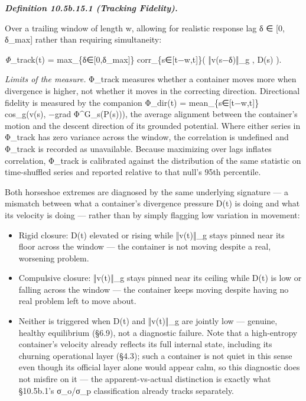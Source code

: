 \documentclass[
]{article}
\begin{document}
\emph{\textbf{Definition 10.5b.15.1 (Tracking Fidelity).}}

Over a trailing window of length w, allowing for realistic response lag
δ ∈ {[}0, δ\_max{]} rather than requiring simultaneity:

\emph{Φ}\_track(t) = max\_\{δ∈{[}0,δ\_max{]}\} corr\_\{s∈{[}t−w,t{]}\}(
‖v(s−δ)‖\_g , D(s) ).

\emph{Limits of the measure.} Φ\_track measures whether a container
moves more when divergence is higher, not whether it moves in the
correcting direction. Directional fidelity is measured by the companion
Φ\_dir(t) = mean\_\{s∈{[}t−w,t{]}\} cos\_g(v(s), −grad Φ\^{}G\_s(P(s))),
the average alignment between the container's motion and the descent
direction of its grounded potential. Where either series in Φ\_track has
zero variance across the window, the correlation is undefined and
Φ\_track is recorded as unavailable. Because maximizing over lags
inflates correlation, Φ\_track is calibrated against the distribution of
the same statistic on time-shuffled series and reported relative to that
null's 95th percentile.

Both horseshoe extremes are diagnosed by the same underlying signature
--- a mismatch between what a container's divergence pressure D(t) is
doing and what its velocity is doing --- rather than by simply flagging
low variation in movement:

\begin{itemize}
\item
  Rigid closure: D(t) elevated or rising while ‖v(t)‖\_g stays pinned
  near its floor across the window --- the container is not moving
  despite a real, worsening problem.
\item
  Compulsive closure: ‖v(t)‖\_g stays pinned near its ceiling while D(t)
  is low or falling across the window --- the container keeps moving
  despite having no real problem left to move about.
\item
  Neither is triggered when D(t) and ‖v(t)‖\_g are jointly low ---
  genuine, healthy equilibrium (§6.9), not a diagnostic failure. Note
  that a high-entropy container's velocity already reflects its full
  internal state, including its churning operational layer (§4.3); such
  a container is not quiet in this sense even though its official layer
  alone would appear calm, so this diagnostic does not misfire on it ---
  the apparent-vs-actual distinction is exactly what §10.5b.1's
  σ\_o/σ\_p classification already tracks separately.
\end{itemize}
\end{document}
